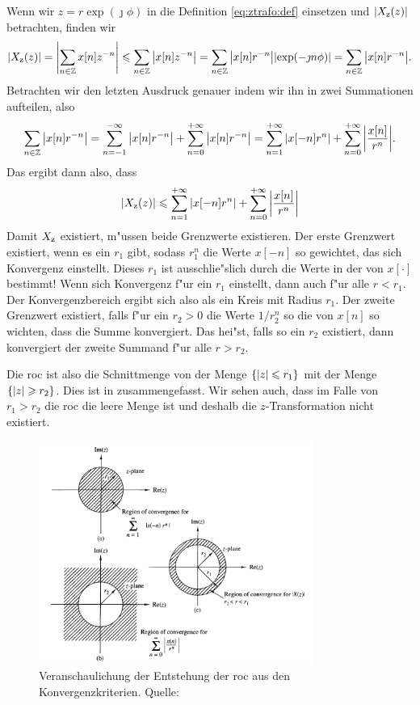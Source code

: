 Wenn wir $z = r\exp(\jmath \phi)$ in die Definition \eqref{eq:ztrafo:def} einsetzen und ${\left| X_{\rm z}(z) \right|}$ betrachten, finden wir
\[
{\left| X_{\rm z}(z) \right|} 
    = {\left| {\sum\limits_{n\in\mathbb{Z}}^{}{x[n] z^{-n}}} \right|}
    \leqslant {\sum\limits_{n\in\mathbb{Z}}^{}{{\left| x[n] z^{-n} \right|}}}
    = {\sum\limits_{n\in\mathbb{Z}}^{}{{\left| x[n] r^{-n} \right|} {\left| \exp(- \jmath n \phi) \right|}}}
    = {\sum\limits_{n\in\mathbb{Z}}^{}{{\left| x[n] r^{-n} \right|}}}.
\]
Betrachten wir den letzten Ausdruck genauer indem wir ihn in zwei Summationen aufteilen, also
\[
{\sum\limits_{n\in\mathbb{Z}}^{}{{\left| x[n] r^{-n} \right|}}} 
    = {\sum\limits_{n=-1}^{-\infty}{{\left| x[n] r^{-n} \right|}}}
    + {\sum\limits_{n=0}^{+\infty}{{\left| x[n] r^{-n} \right|}}}
    = {\sum\limits_{n=1}^{+\infty}{{\left| x[-n] r^{n} \right|}}}
    + {\sum\limits_{n=0}^{+\infty}{{\left| \frac{x[n]}{r^{n}} \right|}}}.
\]
Das ergibt dann also, dass
\[
    {\left| X_{\rm z}(z) \right|} 
        \leqslant {\sum\limits_{n=1}^{+\infty}{{\left| x[-n] r^{n} \right|}}}
        + {\sum\limits_{n=0}^{+\infty}{{\left| \frac{x[n]}{r^{n}} \right|}}}
\]
Damit $X_{\rm z}$ existiert, m"ussen beide Grenzwerte existieren.
Der erste Grenzwert existiert, wenn es ein $r_1$ gibt, sodass $r_1^n$ die Werte $x[-n]$ so gewichtet, das sich Konvergenz einstellt. 
Dieses $r_1$ ist ausschlie"slich durch die Werte in der  von $x[\cdot]$ bestimmt! 
Wenn sich Konvergenz f"ur ein $r_1$ einstellt, dann auch f"ur alle $r < r_1$.
Der Konvergenzbereich ergibt sich also als ein Kreis mit Radius $r_1$.
Der zweite Grenzwert existiert, falls f"ur ein $r_2 > 0$ die Werte $1/r_2^n$ so die  von $x[n]$ so wichten, dass die Summe konvergiert.
Das hei"st, falls so ein $r_2$ existiert, dann konvergiert der zweite Summand f"ur alle $r > r_2$.

Die \gls{roc} ist also die Schnittmenge von der Menge $\{{\left| z \right|} \leqslant r_1\}$ mit der Menge $\{{\left| z \right|} \geqslant r_2\}$.
Dies ist in  zusammengefasst. Wir sehen auch, dass im Falle von $r_1 > r_2$ die \gls{roc} die leere Menge ist und deshalb die $z$-Transformation nicht existiert.

\begin{figure}
    \centering\includegraphics[width=0.8\textwidth]{img/ztrafo/roc.png}
    \caption{Veranschaulichung der Entstehung der \gls{roc} aus den Konvergenzkriterien. Quelle: \cite{proakis2013}}\label{fig:ztrafo:roc}
\end{figure}
%

